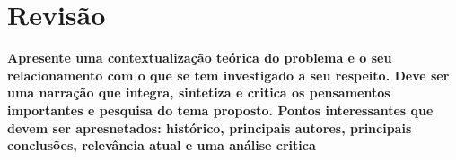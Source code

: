 \chapter{Revisão}
\textbf{Apresente uma contextualização teórica do problema e o seu relacionamento com o que se tem investigado a seu respeito. Deve ser uma narração que integra, sintetiza e critica os pensamentos importantes e pesquisa do tema proposto. Pontos interessantes que devem ser apresnetados: histórico, principais autores, principais conclusões, relevância atual e uma análise critica}

\lipsum[2-4]